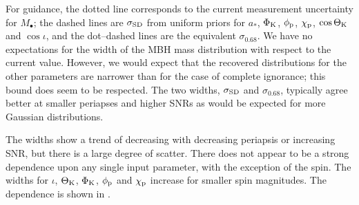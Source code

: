 For guidance, the dotted line corresponds to the current measurement uncertainty for $M_\bullet$; the dashed lines are $\sigma_\mathrm{SD}$ from uniform priors for $a_\ast$, $\Phi_\mathrm{K}$, $\phi_\mathrm{p}$, $\chi_\mathrm{p}$, $\cos\Theta_\mathrm{K}$ and $\cos\iota$, and the dot--dashed lines are the equivalent $\sigma_{0.68}$. We have no expectations for the width of the MBH mass distribution with respect to the current value. However, we would expect that the recovered distributions for the other parameters are narrower than for the case of complete ignorance; this bound does seem to be respected. The two widths, $\sigma_\mathrm{SD}$ and $\sigma_{0.68}$, typically agree better at smaller periapses and higher SNRs as would be expected for more Gaussian distributions.

The widths show a trend of decreasing with decreasing periapsis or increasing SNR, but there is a large degree of scatter. There does not appear to be a strong dependence upon any single input parameter, with the exception of the spin. The widths for $\iota$, $\Theta_\mathrm{K}$, $\Phi_\mathrm{K}$, $\phi_\mathrm{p}$ and $\chi_\mathrm{p}$ increase for smaller spin magnitudes. The dependence is shown in .
